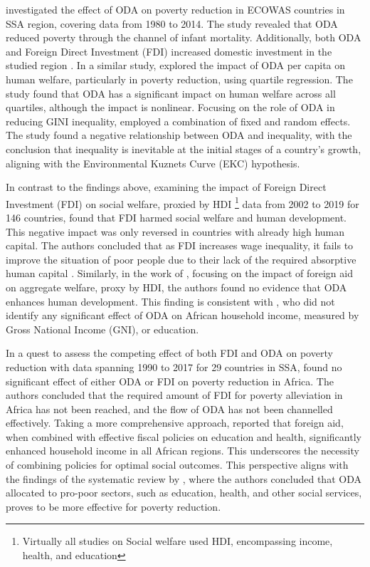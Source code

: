\textcite{david_contribution_2017} investigated the effect of ODA on poverty reduction in ECOWAS countries in SSA region, covering data from 1980 to 2014. The study revealed that ODA reduced poverty through the channel of infant mortality. Additionally, both ODA and Foreign Direct Investment (FDI) increased domestic investment in the studied region \parencite{david_contribution_2017}. In a similar study, \textcite{mohamed_foreign_2017} explored the impact of ODA per capita on human welfare, particularly in poverty reduction, using quartile regression. The study found that ODA has a significant impact on human welfare across all quartiles, although the impact is nonlinear. Focusing on the role of ODA in reducing GINI inequality, \textcite{shafiullah_foreign_2011} employed a combination of fixed and random effects. The study found a negative relationship between ODA and inequality, with the conclusion that inequality is inevitable at the initial stages of a country's growth, aligning with the Environmental Kuznets Curve (EKC) hypothesis.

In contrast to the findings above, \textcite{forte_impact_2023} examining the impact of Foreign Direct Investment (FDI) on social welfare, proxied by HDI \footnote{Virtually all studies on Social welfare used HDI, encompassing income, health, and education} data from 2002 to 2019 for 146 countries, found that FDI harmed social welfare and human development. This negative impact was only reversed in countries with already high human capital. The authors concluded that as FDI increases wage inequality, it fails to improve the situation of poor people due to their lack of the required absorptive human capital \parencite{forte_impact_2023}. Similarly, in the work of \textcite{alves_impact_2023}, focusing on the impact of foreign aid on aggregate welfare, proxy by HDI, the authors found no evidence that ODA enhances human development. This finding is consistent with \textcite{gama_health_2015}, who did not identify any significant effect of ODA on African household income, measured by Gross National Income (GNI), or education.

In a quest to assess the competing effect of both FDI and ODA on poverty reduction with data spanning 1990 to 2017 for 29 countries in SSA, \textcite{anetor_impact_2020} found no significant effect of either ODA or FDI on poverty reduction in Africa. The authors concluded that the required amount of FDI for poverty alleviation in Africa has not been reached, and the flow of ODA has not been channelled effectively. Taking a more comprehensive approach, \textcite{iwegbu_effectiveness_2022} reported that foreign aid, when combined with effective fiscal policies on education and health, significantly enhanced household income in all African regions. This underscores the necessity of combining policies for optimal social outcomes. This perspective aligns with the findings of the systematic review by \textcite{mahembe_foreign_2019}, where the authors concluded that ODA allocated to pro-poor sectors, such as education, health, and other social services, proves to be more effective for poverty reduction.



